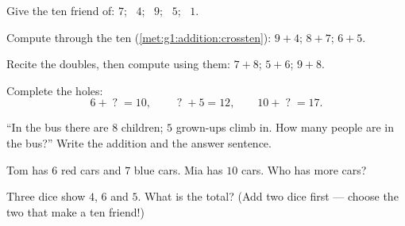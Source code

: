 \begin{exercise}[$\star$]\label{exo:g1:addition:3}
Give the ten friend of: $7$; \ $4$; \ $9$; \ $5$; \ $1$.
\end{exercise}

\begin{exercise}[$\star$]\label{exo:g1:addition:4}
Compute through the ten (\cref{met:g1:addition:crossten}):
$9 + 4$; \quad $8 + 7$; \quad $6 + 5$.
\end{exercise}

\begin{exercise}[$\star$]\label{exo:g1:addition:5}
Recite the doubles, then compute using them: $7 + 8$; \quad
$5 + 6$; \quad $9 + 8$.
\end{exercise}

\begin{exercise}[$\star$]\label{exo:g1:addition:6}
Complete the holes:
\[
6 + \;?\; = 10, \qquad
\;?\; + 5 = 12, \qquad
10 + \;?\; = 17 .
\]
\end{exercise}

\begin{exercise}[$\star$]\label{exo:g1:addition:7}
``In the bus there are $8$ children; $5$ grown-ups climb in. How
many people are in the bus?'' Write the addition and the answer
sentence.
\end{exercise}

\begin{exercise}[$\star$]\label{exo:g1:addition:8}
Tom has $6$ red cars and $7$ blue cars. Mia has $10$ cars. Who has
more cars?
\end{exercise}

\begin{exercise}[$\star\star$]\label{exo:g1:addition:9}
Three dice show $4$, $6$ and $5$. What is the total? (Add two dice
first --- choose the two that make a ten friend!)
\end{exercise}
